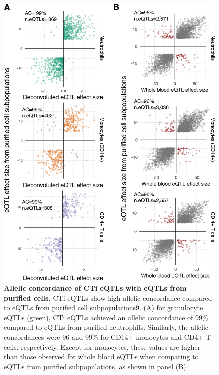 \begin{figure}[H]
	\includegraphics[width=\textwidth]{chapters/chapter4-deconvolution/img/fig5.png}
	\caption{\textbf{Allelic concordance of CTi eQTLs with eQTLs from purified cells.} CTi eQTLs show high allelic concordance compared to eQTLs from purified cell subpopulations9. (A) for granulocyte eQTLs (green), CTi eQTLs achieved an allelic concordance of 99\% compared to eQTLs from purified neutrophils. Similarly, the allelic concordances were 96 and 99\% for CD14+ monocytes and CD4+ T cells, respectively. Except for monocytes, these values are higher than those observed for whole blood eQTLs when comparing to eQTLs from purified subpopulations, as shown in panel (B)}
\end{figure}


